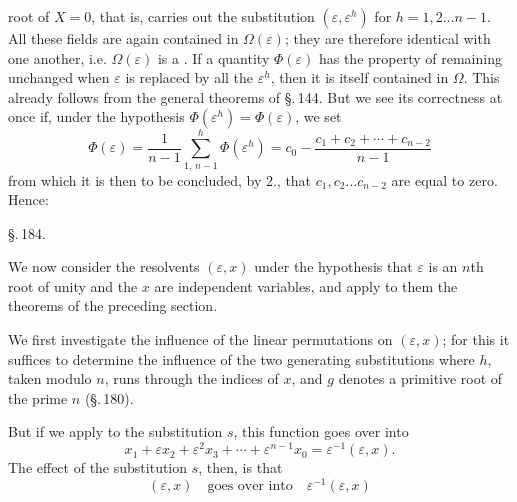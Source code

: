 root of $X = 0$, that is, carries out the substitution $(\varepsilon, \varepsilon^h)$ for $h = 1, 2 \ldots n-1$. All these fields are again contained in $\Omega(\varepsilon)$; they are therefore identical with one another, i.e. $\Omega(\varepsilon)$ is a . If a quantity $\Phi(\varepsilon)$ has the property of remaining unchanged when $\varepsilon$ is replaced by all the $\varepsilon^h$, then it is itself contained in $\Omega$. This already follows from the general theorems of \S.\,144. But we see its correctness at once if, under the hypothesis $\Phi(\varepsilon^h) = \Phi(\varepsilon)$, we set
\[
\Phi(\varepsilon) = \frac{1}{n-1}\sum_{1,\,n-1}^{h}\Phi(\varepsilon^h) = c_0 - \frac{c_1 + c_2 + \cdots + c_{n-2}}{n-1}
\]
from which it is then to be concluded, by 2., that $c_1, c_2 \ldots c_{n-2}$ are equal to zero. Hence:


\begin{center}
\S.\,184.

\end{center}

We now consider the  resolvents $(\varepsilon, x)$ under the hypothesis that $\varepsilon$ is an  $n$th root of unity and the $x$ are independent variables, and apply to them the theorems of the preceding section.

We first investigate the influence of the linear permutations on $(\varepsilon, x)$; for this it suffices to determine the influence of the two generating substitutions
where $h$, taken modulo $n$, runs through the indices of $x$, and $g$ denotes a primitive root of the prime $n$ (\S.\,180).

But if we apply to
the substitution $s$, this function goes over into
\[
x_1 + \varepsilon x_2 + \varepsilon^2 x_3 + \cdots + \varepsilon^{n-1}x_0 = \varepsilon^{-1}(\varepsilon, x).
\]
The effect of the substitution $s$, then, is that
\[
(\varepsilon, x) \quad \text{goes over into} \quad \varepsilon^{-1}(\varepsilon, x)
\]
